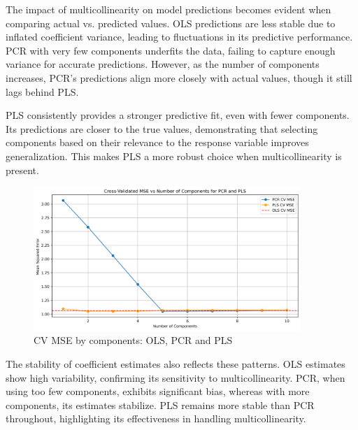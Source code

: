 \documentclass[11pt,twoside,a4paper]{article}
\begin{document}
The impact of multicollinearity on model predictions becomes evident when comparing actual vs. predicted values. OLS predictions are less stable due to inflated coefficient variance, leading to fluctuations in its predictive performance. PCR with very few components underfits the data, failing to capture enough variance for accurate predictions. However, as the number of components increases, PCR’s predictions align more closely with actual values, though it still lags behind PLS.

PLS consistently provides a stronger predictive fit, even with fewer components. Its predictions are closer to the true values, demonstrating that selecting components based on their relevance to the response variable improves generalization. This makes PLS a more robust choice when multicollinearity is present.

\begin{figure}[H]
    \centering
    \includegraphics[width=0.9\textwidth]{Second_plot_second_simulation.png}
    \caption{CV MSE by components: OLS, PCR and PLS}
    \label{fig:PLS_analysis}
\end{figure}

The stability of coefficient estimates also reflects these patterns. OLS estimates show high variability, confirming its sensitivity to multicollinearity. PCR, when using too few components, exhibits significant bias, whereas with more components, its estimates stabilize. PLS remains more stable than PCR throughout, highlighting its effectiveness in handling multicollinearity.
\end{document}
